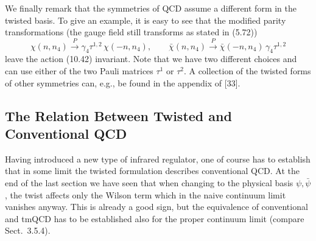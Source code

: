 We finally remark that the symmetries of QCD assume a different form in the
twisted basis. To give an example, it is easy to see that the modified parity
transformations (the gauge field still transforms as stated in (5.72))
\begin{equation}
  \chi(n, n_4) \xrightarrow{P} \gamma_4\tau^{1,2}\,\chi(-n, n_4) , \qquad
  \bar\chi(n, n_4) \xrightarrow{P} \bar\chi(-n, n_4)\,\gamma_4\tau^{1,2}
\end{equation}
leave the action (10.42) invariant. Note that we have two different choices
and can use either of the two Pauli matrices $\tau^1$ or $\tau^2$. A collection
of the twisted forms of other symmetries can, e.g., be found in the appendix
of [33].

\subsection{The Relation Between Twisted and Conventional QCD}

Having introduced a new type of infrared regulator, one of course has to
establish that in some limit the twisted formulation describes conventional
QCD. At the end of the last section we have seen that when changing to the
physical basis $\psi, \bar\psi$, the twist affects only the Wilson term which
in the naive continuum limit vanishes anyway. This is already a good sign, but
the equivalence of conventional and tmQCD has to be established also for the
proper continuum limit (compare Sect.~3.5.4).

